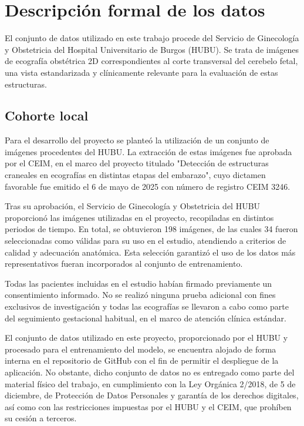 
\section{Descripción formal de los datos}
El conjunto de datos utilizado en este trabajo procede del Servicio de Ginecología y Obstetricia del Hospital Universitario de Burgos (HUBU). Se trata de imágenes de ecografía obstétrica 2D correspondientes al corte transversal del cerebelo fetal, una vista estandarizada y clínicamente relevante para la evaluación de estas estructuras.

\subsection{Cohorte local}
Para el desarrollo del proyecto se planteó la utilización de un conjunto de imágenes procedentes del HUBU. La extracción de estas imágenes fue aprobada por el CEIM, en el marco del proyecto titulado "Detección de estructuras craneales en ecografías en distintas etapas del embarazo", cuyo dictamen favorable fue emitido el 6 de mayo de 2025 con número de registro CEIM 3246.

Tras su aprobación, el Servicio de Ginecología y Obstetricia del HUBU proporcionó las imágenes utilizadas en el proyecto, recopiladas en distintos periodos de tiempo. En total, se obtuvieron 198 imágenes, de las cuales 34 fueron seleccionadas como válidas para su uso en el estudio, atendiendo a criterios de calidad y adecuación anatómica. Esta selección garantizó el uso de los datos más representativos fueran incorporados al conjunto de entrenamiento.

Todas las pacientes incluidas en el estudio habían firmado previamente un consentimiento informado. No se realizó ninguna prueba adicional con fines exclusivos de investigación y todas las ecografías se llevaron a cabo como parte del seguimiento gestacional habitual, en el marco de atención clínica estándar.

El conjunto de datos utilizado en este proyecto, proporcionado por el HUBU y procesado para el entrenamiento del modelo, se encuentra alojado de forma interna en el repositorio de GitHub con el fin de permitir el despliegue de la aplicación. No obstante, dicho conjunto de datos no es entregado como parte del material físico del trabajo, en cumplimiento con la Ley Orgánica 2/2018, de 5 de diciembre, de Protección de Datos Personales y garantía de los derechos digitales, así como con las restricciones impuestas por el HUBU y el CEIM, que prohíben su cesión a terceros.

